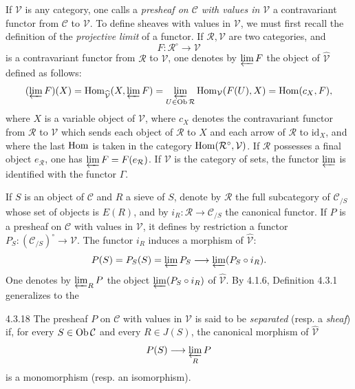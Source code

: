 \label{IV.4.3.17}
If \(\mathcal V\) is any category, one calls a \emph{presheaf on
\(\mathcal C\) with values in \(\mathcal V\)} a contravariant
functor from \(\mathcal C\) to \(\mathcal V\).
To define sheaves with values in \(\mathcal V\), we must first
recall the definition of the \emph{projective limit} of a functor.
If \(\mathcal R,\mathcal V\) are two categories, and
\[
F:\mathcal R^\circ\longrightarrow\mathcal V
\]
is a contravariant functor from \(\mathcal R\) to \(\mathcal V\),
one denotes by \(\varprojlim F\) the object of
\(\widehat{\mathcal V}\) defined as follows:
\[
(\varprojlim F)(X)=\operatorname{Hom}_{\widehat{\mathcal V}}(X,\varprojlim F)
=\varprojlim_{U\in\operatorname{Ob}\mathcal R}\operatorname{Hom}_{\mathcal V}(F(U),X)
=\operatorname{Hom}(c_X,F),
\]
where \(X\) is a variable object of \(\mathcal V\), where \(c_X\)
denotes the contravariant functor from \(\mathcal R\) to
\(\mathcal V\) which sends each object of \(\mathcal R\) to \(X\)
and each arrow of \(\mathcal R\) to \(\mathrm{id}_X\), and where
the last \(\operatorname{Hom}\) is taken in the category
\(\operatorname{Hom}(\mathcal R^\circ,\mathcal V)\).
If \(\mathcal R\) possesses a final object \(e_{\mathcal R}\),
one has \(\varprojlim F=F(e_{\mathcal R})\).
If \(\mathcal V\) is the category of sets, the functor
\(\varprojlim\) is identified with the functor \(\Gamma\).

If \(S\) is an object of \(\mathcal C\) and \(R\) a sieve of \(S\),
denote by \(\mathcal R\) the full subcategory of \(\mathcal C_{/S}\)
whose set of objects is \(E(R)\), and by
\(i_R:\mathcal R\to\mathcal C_{/S}\) the canonical functor.
If \(P\) is a presheaf on \(\mathcal C\) with values in
\(\mathcal V\), it defines by restriction a functor
\(P_S:(\mathcal C_{/S})^\circ\to\mathcal V\).
The functor \(i_R\) induces a morphism of \(\widehat{\mathcal V}\):
\[
P(S)=P_S(S)=\varprojlim P_S\longrightarrow\varprojlim(P_S\circ i_R).
\]
One denotes by \(\varprojlim_R P\) the object
\(\varprojlim(P_S\circ i_R)\) of \(\widehat{\mathcal V}\).
By 4.1.6, Definition 4.3.1 generalizes to the

\begin{definition}{4.3.18}\label{IV.4.3.18}
The presheaf \(P\) on \(\mathcal C\) with values in \(\mathcal V\)
is said to be \emph{separated} (resp. a \emph{sheaf}) if, for
every \(S\in\operatorname{Ob}\mathcal C\) and every \(R\in J(S)\), the
canonical morphism of \(\widehat{\mathcal V}\)
\[
P(S)\longrightarrow\varprojlim_R P
\]
is a monomorphism (resp. an isomorphism).
\end{definition}

